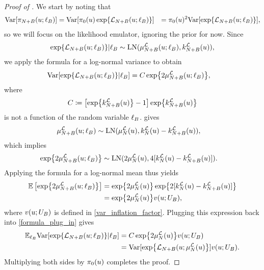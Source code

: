 \documentclass[12pt]{article}
\begin{document}
\begin{proof} [Proof of ]
We start by noting that 
\begin{align*}
\Var[\llikEmRdmDens[\Naugment](\Par; \designBatchLlik)]
&= \Var[\priorDens(\Par) \Exp{\llikEm[\Naugment](\Par; \designBatchLlik)}] 
&= \priorDens(\Par)^2 \Var[\Exp{\llikEm[\Naugment](\Par; \designBatchLlik)}],
\end{align*}
so we will focus on the likelihood emulator, ignoring the prior for now. Since 
\begin{align*}
\Exp{\llikEm[\Naugment](\Par; \designBatchLlik)}|\designBatchLlik \sim 
\LN(\emMean[\Naugment]{\llik}(\Par; \designBatchLlik), \emKer[\Naugment]{\llik}(\Par)),
\end{align*}
we apply the formula for a log-normal variance to obtain 
\begin{align}
\Var[\Exp{\llikEm[\Naugment](\Par; \designBatchLlik)} | \designBatchLlik] 
&= \cst \Exp{2\emMean[\Naugment]{\llik}(\Par; \designBatchLlik)}, \label{formula_plug_in}
\end{align}
where 
\begin{align*}
\cst \Def \left[\Exp{\emKer[\Naugment]{\llik}(\Par)} -1 \right] \Exp{\emKer[\Naugment]{\llik}(\Par)}
\end{align*}
is not a function of the random variable $\designBatchLlik$.  gives 
\begin{align*}
\emMean[\Naugment]{\llik}(\Par; \designBatchLlik)
&\sim \LN(\emMean[\Ndesign]{\llik}(\Par), \emKer[\Ndesign]{\llik}(\Par) - \emKer[\Naugment]{\llik}(\Par)), 
\end{align*}
which implies 
\begin{align*}
\Exp{2\emMean[\Naugment]{\llik}(\Par; \designBatchLlik)}
&\sim \LN(2\emMean[\Ndesign]{\llik}(\Par), 4[\emKer[\Ndesign]{\llik}(\Par) - \emKer[\Naugment]{\llik}(\Par)]).
\end{align*}
Applying the formula for a log-normal mean thus yields 
\begin{align*}
\E\left[\Exp{2\emMean[\Naugment]{\llik}(\Par; \designBatchLlik)} \right]
&= \Exp{2\emMean[\Ndesign]{\llik}(\Par)} \Exp{2[\emKer[\Ndesign]{\llik}(\Par) - \emKer[\Naugment]{\llik}(\Par)]} \\
&=  \Exp{2\emMean[\Ndesign]{\llik}(\Par)} \varInflation(\Par; \designBatchIn), 
\end{align*}
where $\varInflation(\Par; \designBatchIn)$ is defined in \ref{var_inflation_factor}. Plugging this expression back 
into \ref{formula_plug_in} gives 
\begin{align*}
\E_{\designBatchLlik} \Var[\Exp{\llikEm[\Naugment](\Par; \designBatchLlik)} | \designBatchLlik] 
&= \cst \Exp{2\emMean[\Ndesign]{\llik}(\Par)} \varInflation(\Par; \designBatchIn) \\
&= \Var[\Exp{\llikEm[\Naugment](\Par; \emMean[\Ndesign]{\llik}(\Par)}] \varInflation(\Par; \designBatchIn).
\end{align*}
Multiplying both sides by $\priorDens(\Par)$ completes the proof. 
\end{proof}
\end{document}
